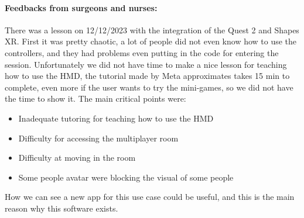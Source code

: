 \paragraph{Feedbacks from surgeons and nurses:}

There was a lesson on 12/12/2023 with the integration of the Quest 2 and Shapes XR. First it was pretty chaotic, a lot of people did not even know how to use the controllers,
and they had problems even putting in the code for entering the session. Unfortunately we did not have time to make a nice lesson for teaching how to use the HMD,
the tutorial made by Meta approximates takes 15 min to complete, even more if the user wants to try the mini-games, so we did not have the time to show it. The main critical points were: 

\begin{itemize}
  \item Inadequate tutoring for teaching how to use the \ac{HMD}
  \item Difficulty for accessing the multiplayer room
  \item Difficulty at moving in the room
  \item Some people avatar were blocking the visual of some people
\end{itemize}
\noindent
How we can see a new app for this use case could be useful, and this is the main reason why this software exists. 